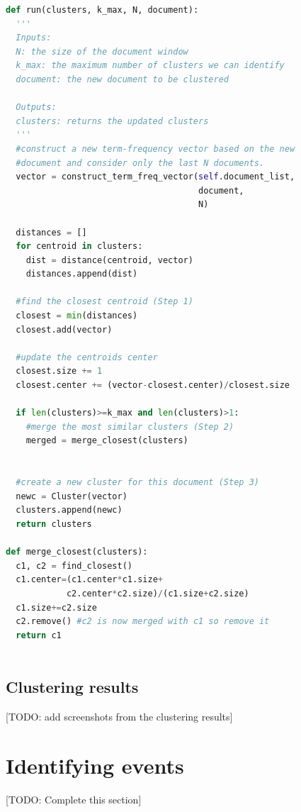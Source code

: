 \begin{lstlisting}[language=Python, label=OnlineClustererSnippet, caption=Pseudocode for the online clustering algorithm]
def run(clusters, k_max, N, document):
  '''
  Inputs:
  N: the size of the document window
  k_max: the maximum number of clusters we can identify 
  document: the new document to be clustered 

  Outputs:
  clusters: returns the updated clusters
  '''    
  #construct a new term-frequency vector based on the new
  #document and consider only the last N documents. 
  vector = construct_term_freq_vector(self.document_list, 
                                      document, 
                                      N)

  distances = []
  for centroid in clusters:
    dist = distance(centroid, vector)
    distances.append(dist)
  
  #find the closest centroid (Step 1)
  closest = min(distances)
  closest.add(vector)

  #update the centroids center  
  closest.size += 1
  closest.center += (vector-closest.center)/closest.size
  
  if len(clusters)>=k_max and len(clusters)>1:
    #merge the most similar clusters (Step 2)
    merged = merge_closest(clusters)
  
  
  #create a new cluster for this document (Step 3)
  newc = Cluster(vector)
  clusters.append(newc)
  return clusters
  
def merge_closest(clusters):
  c1, c2 = find_closest()
  c1.center=(c1.center*c1.size+
            c2.center*c2.size)/(c1.size+c2.size)
  c1.size+=c2.size
  c2.remove() #c2 is now merged with c1 so remove it
  return c1
    
\end{lstlisting}

\subsection{Clustering results}
[TODO: add screenshots from the clustering results]

\section{Identifying events}
[TODO: Complete this section]

